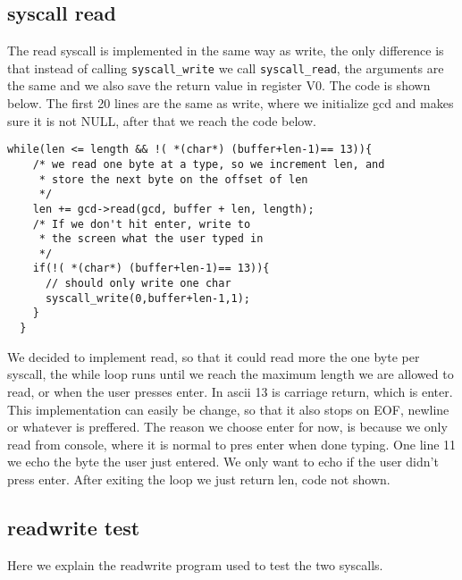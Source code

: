 \documentclass[11pt]{article}
\begin{document}
\subsection{syscall read}
The read syscall is implemented in the same way as write, the only difference is that instead of calling \verb|syscall_write| we call \verb|syscall_read|, the arguments are the same and we also save the return value in register V0. The code is shown below.
The first 20 lines are the same as write, where we initialize gcd and makes sure it is not NULL, after that we reach the code below. 
\begin{lstlisting}
while(len <= length && !( *(char*) (buffer+len-1)== 13)){
    /* we read one byte at a type, so we increment len, and
     * store the next byte on the offset of len
     */
    len += gcd->read(gcd, buffer + len, length);
    /* If we don't hit enter, write to
     * the screen what the user typed in
     */
    if(!( *(char*) (buffer+len-1)== 13)){
      // should only write one char
      syscall_write(0,buffer+len-1,1);
    }
  }
\end{lstlisting}
We decided to implement read, so that it could read more the one byte per syscall, the while loop runs until we reach the maximum length we are allowed to read, or when the user presses enter. In ascii 13 is carriage return, which is enter. This implementation can easily be change, so that it also stops on EOF, newline or whatever is preffered. The reason we choose enter for now, is because we only read from console, where it is normal to pres enter when done typing. One line 11 we echo the byte the user just entered. We only want to echo if the user didn't press enter. After exiting the loop we just return len, code not shown.

\subsection{readwrite test}
Here we explain the readwrite program used to test the two syscalls.
\end{document}
